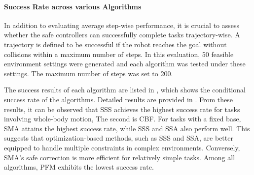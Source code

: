 \paragraph{Success Rate across various Algorithms}
In addition to evaluating average step-wise performance, it is crucial to assess whether the safe controllers can successfully complete tasks trajectory-wise. A trajectory is defined to be successful if the robot reaches the goal without collisions within a maximum number of steps. In this evaluation, 50 feasible environment settings were generated and each algorithm was tested under these settings. The maximum number of steps was set to 200.  

The success results of each algorithm are listed in , which shows the conditional success rate of the algorithms. Detailed results are provided in . From these results, it can be observed that SSS achieves the highest success rate for tasks involving whole-body motion, The second is CBF. For tasks with a fixed base, SMA attains the highest success rate, while SSS and SSA also perform well. This suggests that optimization-based methods, such as SSS and SSA, are better equipped to handle multiple constraints in complex environments. Conversely, SMA's safe correction is more efficient for relatively simple tasks. Among all algorithms, PFM exhibits the lowest success rate. 

\def\dataA{{
{1.0000, 0.5000, 0.5250, 0.9500, 0.9500},
{1.0000, 1.0000, 0.7500, 0.9500, 1.0000},
{0.9545, 0.6818, 1.0000, 0.9545, 0.9545},
{0.8085, 0.4043, 0.4468, 1.0000, 0.7872},
{0.9744, 0.5128, 0.5385, 0.9487, 1.0000}
}}

\def\dataB{{
{1.0000, 0.6977, 0.6279, 1.0000, 1.0000},
{0.9677, 1.0000, 0.7742, 0.9677, 0.9677},
{0.9643, 0.8571, 1.0000, 0.9643, 0.9643},
{0.9149, 0.6383, 0.5745, 1.0000, 0.9149},
{0.9773, 0.6818, 0.6136, 0.9773, 1.0000}
}}

\def\dataC{{
{1.0000, 0.4419, 0.7907, 0.9767, 1.0000},
{1.0000, 1.0000, 0.9474, 1.0000, 1.0000},
{1.0000, 0.5294, 1.0000, 0.9706, 1.0000},
{0.8750, 0.3958, 0.6875, 1.0000, 0.8958},
{0.9556, 0.4222, 0.7556, 0.9556, 1.0000}
}}

\def\dataD{{
{1.0000, 0.6200, 1.0000, 1.0000, 1.0000},
{1.0000, 1.0000, 1.0000, 1.0000, 1.0000},
{1.0000, 0.6200, 1.0000, 1.0000, 1.0000},
{1.0000, 0.6200, 1.0000, 1.0000, 1.0000},
{1.0000, 0.6200, 1.0000, 1.0000, 1.0000}
}}

\def\dataE{{
{1.0000, 0.6250, 0.9750, 0.5000, 0.9750},
{0.8621, 1.0000, 0.8966, 0.5862, 0.8966},
{0.8864, 0.5909, 1.0000, 0.4773, 0.9773},
{0.8696, 0.7391, 0.9130, 1.0000, 0.9130},
{0.8667, 0.5778, 0.9556, 0.4667, 1.0000}
}}

